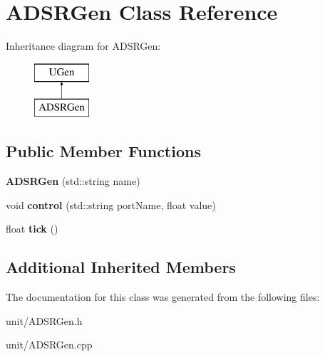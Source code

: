 \hypertarget{classADSRGen}{}\section{A\+D\+S\+R\+Gen Class Reference}
\label{classADSRGen}
Inheritance diagram for A\+D\+S\+R\+Gen\+:\begin{figure}[H]
\begin{center}
\leavevmode
\includegraphics[height=2.000000cm]{classADSRGen}
\end{center}
\end{figure}
\subsection*{Public Member Functions}
\begin{DoxyCompactItemize}
\item 
{\bfseries A\+D\+S\+R\+Gen} (std\+::string name)\hypertarget{classADSRGen_a7e2d63eecbe51fc86a93697dd4d47964}{}\label{classADSRGen_a7e2d63eecbe51fc86a93697dd4d47964}

\item 
void {\bfseries control} (std\+::string port\+Name, float value)\hypertarget{classADSRGen_ac43bddd25b9a84f0ad6b299ed55f5133}{}\label{classADSRGen_ac43bddd25b9a84f0ad6b299ed55f5133}

\item 
float {\bfseries tick} ()\hypertarget{classADSRGen_a91a149fa5065d94dccec224b18710a24}{}\label{classADSRGen_a91a149fa5065d94dccec224b18710a24}

\end{DoxyCompactItemize}
\subsection*{Additional Inherited Members}


The documentation for this class was generated from the following files\+:\begin{DoxyCompactItemize}
\item 
unit/A\+D\+S\+R\+Gen.\+h\item 
unit/A\+D\+S\+R\+Gen.\+cpp\end{DoxyCompactItemize}
